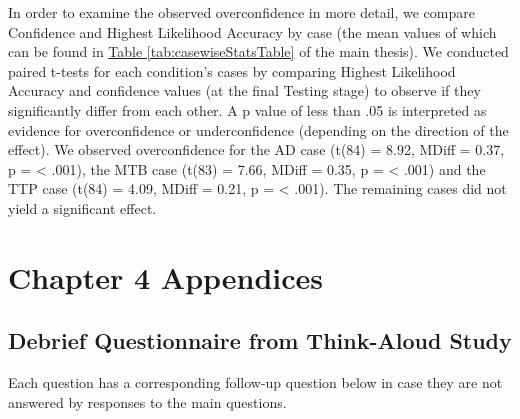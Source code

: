 \documentclass[a4paper, nobind]{templates/ociamthesis}
\begin{document}
\hfill\break
In order to examine the observed overconfidence in more detail, we compare Confidence and Highest Likelihood Accuracy by case (the mean values of which can be found in \hyperref[tab:casewiseStatsTable]{Table \ref{tab:casewiseStatsTable}} of the main thesis). We conducted paired t-tests for each condition's cases by comparing Highest Likelihood Accuracy and confidence values (at the final Testing stage) to observe if they significantly differ from each other. A p value of less than .05 is interpreted as evidence for overconfidence or underconfidence (depending on the direction of the effect). We observed overconfidence for the AD case (t(84) = 8.92, MDiff = 0.37, p = \textless{} .001), the MTB case (t(83) = 7.66, MDiff = 0.35, p = \textless{} .001) and the TTP case (t(84) = 4.09, MDiff = 0.21, p = \textless{} .001). The remaining cases did not yield a significant effect.

\newpage

\chapter{Chapter 4 Appendices}\label{chapter-4-appendices}

\section{Debrief Questionnaire from Think-Aloud Study}\label{debriefqs}

Each question has a corresponding follow-up question below in case they are not answered by responses to the main questions.
\end{document}
